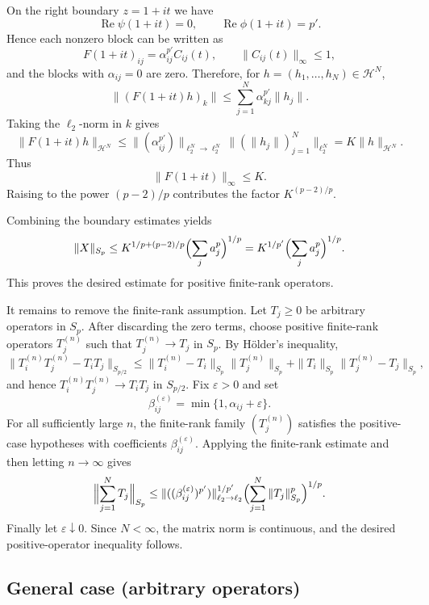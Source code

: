 \documentclass[11pt]{article}
\theoremstyle{definition}
\newcommand{\1}{\mathbf{1}}
\begin{document}
On the right boundary $z=1+it$ we have
\[
\operatorname{Re}\psi(1+it)=0,\qquad \operatorname{Re}\phi(1+it)=p'.
\]
Hence each nonzero block can be written as
\[
F(1+it)_{ij}=\alpha_{ij}^{p'} C_{ij}(t),
\qquad \|C_{ij}(t)\|_{\infty}\le 1,
\]
and the blocks with $\alpha_{ij}=0$ are zero. Therefore, for
$h=(h_1,\dots,h_N)\in \mathcal H^N$,
\[
\|(F(1+it)h)_k\|
\le
\sum_{j=1}^N \alpha_{kj}^{p'}\|h_j\|.
\]
Taking the $\ell_2$-norm in $k$ gives
\[
\|F(1+it)h\|_{\mathcal H^N}
\le
\|(\alpha_{ij}^{p'})\|_{\ell_2^N\to\ell_2^N}
\bigl\|(\|h_j\|)_{j=1}^N\bigr\|_{\ell_2^N}
=
K\|h\|_{\mathcal H^N}.
\]
Thus
\[
\|F(1+it)\|_\infty\le K.
\]
Raising to the power $(p-2)/p$ contributes the factor $K^{(p-2)/p}$.

Combining the boundary estimates yields
\[
\|X\|_{S_p}\leq K^{1/p+(p-2)/p}\Bigl(\sum_j a_j^p\Bigr)^{1/p}=K^{1/p'}\Bigl(\sum_j a_j^p\Bigr)^{1/p}.
\]
This proves the desired estimate for positive finite-rank operators.

It remains to remove the finite-rank assumption. Let $T_j\ge0$ be arbitrary
operators in $S_p$. After discarding the zero terms, choose positive finite-rank
operators $T_j^{(n)}$ such that $T_j^{(n)}\to T_j$ in $S_p$. By Hölder's
inequality,
\[
\|T_i^{(n)}T_j^{(n)}-T_iT_j\|_{S_{p/2}}
\le
\|T_i^{(n)}-T_i\|_{S_p}\|T_j^{(n)}\|_{S_p}
+
\|T_i\|_{S_p}\|T_j^{(n)}-T_j\|_{S_p},
\]
and hence $T_i^{(n)}T_j^{(n)}\to T_iT_j$ in $S_{p/2}$. Fix $\varepsilon>0$ and set
\[
\beta_{ij}^{(\varepsilon)}=\min\{1,\alpha_{ij}+\varepsilon\}.
\]
For all sufficiently large $n$, the finite-rank family $(T_j^{(n)})$ satisfies
the positive-case hypotheses with coefficients $\beta_{ij}^{(\varepsilon)}$.
Applying the finite-rank estimate and then letting $n\to\infty$ gives
\[
\Bigl\|\sum_{j=1}^N T_j\Bigr\|_{S_p}
\le
\|((\beta_{ij}^{(\varepsilon)})^{p'})\|_{\ell_2\to\ell_2}^{1/p'}
\Bigl(\sum_{j=1}^N\|T_j\|_{S_p}^p\Bigr)^{1/p}.
\]
Finally let $\varepsilon\downarrow0$. Since $N<\infty$, the matrix norm is
continuous, and the desired positive-operator inequality follows.

\subsection{General case (arbitrary operators)}
\label{subsec:general}
\end{document}
